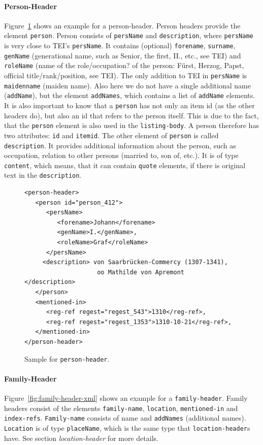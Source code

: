 \paragraph{Person-Header}
Figure~\ref{fig:person-header-xml} shows an example for a person-header. Person headers provide the element \texttt{person}. Person consists of \texttt{persName} and \texttt{description}, where \texttt{persName} is very close to TEI's \texttt{persName}. It contains (optional) \texttt{forename}, \texttt{surname}, \texttt{genName} (generational name, such as Senior, the first, II., etc., see TEI) and \texttt{roleName} (name of the role/occupation? of the person: Fürst, Herzog, Papst, official title/rank/position, see TEI). The only addition to TEI in \texttt{persName} is \texttt{maidenname} (maiden name). Also here we do not have a single additional name (\texttt{addName}), but the element \texttt{addNames}, which contains a list of \texttt{addName} elements. It is also important to know that a \texttt{person} has not only an item id (as the other headers do), but also an id that refers to the person itself. This is due to the fact, that the \texttt{person} element is also used in the \texttt{listing-body}. A person therefore has two attributes: \texttt{id} and \texttt{itemid}.
The other element of \texttt{person} is called \texttt{description}. It provides additional information about the person, such as occupation, relation to other persons (married to, son of, etc.). It is of type \texttt{content}, which means, that it can contain \texttt{quote} elements, if there is original text in the \texttt{description}.

\begin{figure}[H]
\centering
\begin{verbatim}
<person-header>
   <person id="person_412">
      <persName>
         <forename>Johann</forename> 
         <genName>I.</genName>, 
         <roleName>Graf</roleName>
      </persName>
     <description> von Saarbrücken-Commercy (1307-1341), 
                    oo Mathilde von Apremont    </description>
   </person>
   <mentioned-in>
      <reg-ref regest="regest_543">1310</reg-ref>, 
      <reg-ref regest="regest_1353">1310-10-21</reg-ref>, 
   </mentioned-in>
</person-header>
\end{verbatim}
\label{fig:person-header-xml}
\caption{Sample for \texttt{person-header}.}
\end{figure}

\paragraph{Family-Header}
Figure~\ref{fig:family-header-xml} shows an example for a \texttt{family-header}. Family headers consist of the elements \texttt{family-name}, \texttt{location}, \texttt{mentioned-in} and \texttt{index-refs}. \texttt{Family-name} consists of name and \texttt{addNames} (additional names). \texttt{Location} is of type \texttt{placeName}, which is the same type that \texttt{location-header}s have. See section \textit{location-header} for more details.

